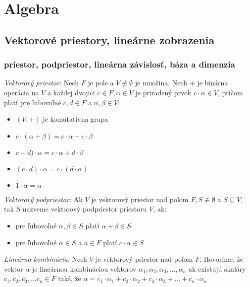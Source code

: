 \chapter[Algebra]{Algebra}

\label{algebra} %

\section{Vektorové priestory, lineárne zobrazenia}
\subsection*{priestor, podpriestor, lineárna závislosť, báza a dimenzia}
\emph{Vektorový priestor:} Nech $F$ je pole a $V \not\equiv \emptyset$ je množina. Nech $+$ je binárna operácia na $V$ a každej dvojici $c \in F, \alpha \in V$ je priradený prvok $c \cdot \alpha \in V$, pričom platí pre ľubovoľné $c, d \in F$ a $\alpha, \beta \in V$:
\begin{itemize}
    \item $(V, +)$ je komutatívna grupa
    \item $c \cdot (\alpha + \beta) = c \cdot \alpha + c \cdot \beta$
    \item $c + d)\cdot\alpha = c\cdot\alpha + d\cdot\beta $
    \item $(c \cdot d)\cdot\alpha = c \cdot (d\cdot\alpha)$
    \item $1\cdot\alpha = \alpha$
\end{itemize}

\bigskip

\emph{Vektorový podpriestor:} Ak $V$ je vektorový priestor nad poľom $F, S \not\equiv \emptyset$ a $S \subseteq V$, tak $S$ nazveme vektorový podpriestor priestoru $V$, ak:
\begin{itemize}
    \item pre ľubovoľné $\alpha, \beta \in S$ platí $\alpha + \beta \in S$
    \item pre ľubovoľné $\alpha \in S$ a $a \in F$ platí $c \cdot \alpha \in S$
\end{itemize}  

\bigskip

\emph{Lineárna kombinácia:} Nech $V$ je vektorový priestor nad poľom $F$. Hovoríme, že vektor $\alpha$ je lineárnou kombináciou vektorov 
$\alpha_1, \alpha_2, \alpha_3, ... , \alpha_n$ ak existujú skaláry $c_1, c_2, c_3, ... c_n \in F$ také, že 
$\alpha = c_1 \cdot \alpha_1 + c_2 \cdot \alpha_2 + c_3 \cdot \alpha_3 + ... + c_n \cdot \alpha_n$

